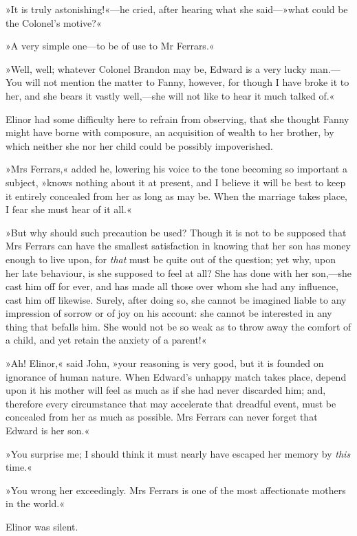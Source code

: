 »It is truly astonishing!«—he cried, after hearing what she said—»what could be the Colonel’s motive?«

»A very simple one—to be of use to Mr Ferrars.«

»Well, well; whatever Colonel Brandon may be, Edward is a very lucky man.—You will not mention the matter to Fanny, however, for though I have broke it to her, and she bears it vastly well,—she will not like to hear it much talked of.«

Elinor had some difficulty here to refrain from observing, that she thought Fanny might have borne with composure, an acquisition of wealth to her brother, by which neither she nor her child could be possibly impoverished.

»Mrs Ferrars,« added he, lowering his voice to the tone becoming so important a subject, »knows nothing about it at present, and I believe it will be best to keep it entirely concealed from her as long as may be. When the marriage takes place, I fear she must hear of it all.«

»But why should such precaution be used? Though it is not to be supposed that Mrs Ferrars can have the smallest satisfaction in knowing that her son has money enough to live upon, for \textit{that} must be quite out of the question; yet why, upon her late behaviour, is she supposed to feel at all? She has done with her son,—she cast him off for ever, and has made all those over whom she had any influence, cast him off likewise. Surely, after doing so, she cannot be imagined liable to any impression of sorrow or of joy on his account: she cannot be interested in any thing that befalls him. She would not be so weak as to throw away the comfort of a child, and yet retain the anxiety of a parent!«

»Ah! Elinor,« said John, »your reasoning is very good, but it is founded on ignorance of human nature. When Edward’s unhappy match takes place, depend upon it his mother will feel as much as if she had never discarded him; and, therefore every circumstance that may accelerate that dreadful event, must be concealed from her as much as possible. Mrs Ferrars can never forget that Edward is her son.«

»You surprise me; I should think it must nearly have escaped her memory by \textit{this} time.«

»You wrong her exceedingly. Mrs Ferrars is one of the most affectionate mothers in the world.«

Elinor was silent.

